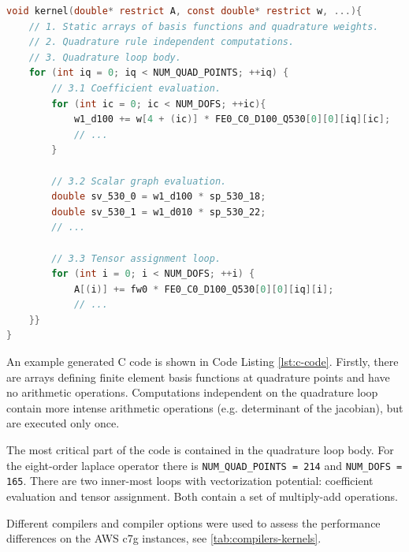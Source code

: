 \lstset{style=CStyle}
\begin{lstlisting}[language=c,
    caption=FFCx generated finite element kernel.,
    basicstyle=\ttfamily\footnotesize,
    keywordstyle=\ttb\color{deepblue}\footnotesize,
    label=lst:c-code]
void kernel(double* restrict A, const double* restrict w, ...){
    // 1. Static arrays of basis functions and quadrature weights.
    // 2. Quadrature rule independent computations.
    // 3. Quadrature loop body.
    for (int iq = 0; iq < NUM_QUAD_POINTS; ++iq) {
        // 3.1 Coefficient evaluation.
        for (int ic = 0; ic < NUM_DOFS; ++ic){
            w1_d100 += w[4 + (ic)] * FE0_C0_D100_Q530[0][0][iq][ic];
            // ...
        }

        // 3.2 Scalar graph evaluation.
        double sv_530_0 = w1_d100 * sp_530_18;
        double sv_530_1 = w1_d010 * sp_530_22;
        // ...

        // 3.3 Tensor assignment loop.
        for (int i = 0; i < NUM_DOFS; ++i) {
            A[(i)] += fw0 * FE0_C0_D100_Q530[0][0][iq][i];
            // ...
    }}
}
\end{lstlisting}

An example generated C code is shown in Code Listing \ref{lst:c-code}. Firstly,
there are arrays defining finite element basis functions at quadrature points
and have no arithmetic operations. Computations independent on the quadrature
loop contain more intense arithmetic operations (e.g. determinant of the
jacobian), but are executed only once.

The most critical part of the code is contained in the quadrature loop body. For
the eight-order laplace operator there is \lstinline{NUM_QUAD_POINTS = 214} and
\lstinline{NUM_DOFS = 165}. There are two inner-most loops with vectorization
potential: coefficient evaluation and tensor assignment. Both contain a set of
multiply-add operations.

Different compilers and compiler options were used to assess the performance
differences on the AWS c7g instances, see \autoref{tab:compilers-kernels}.

